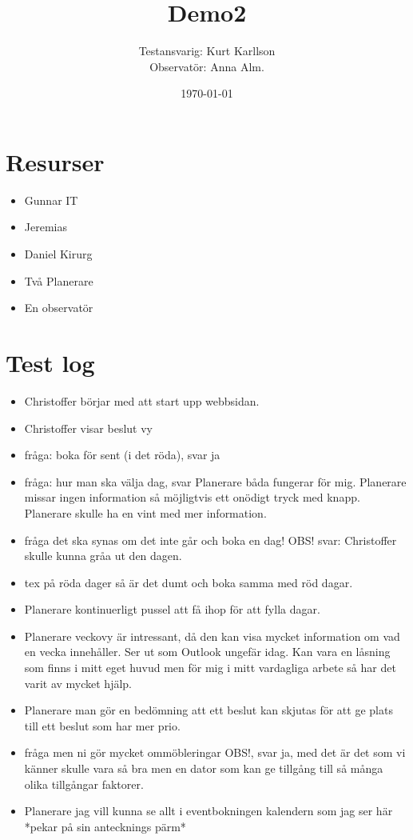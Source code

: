 \documentclass[a4paper,10pt, twoside]{article}
\title{Demo2}
\author{Testansvarig: Kurt Karllson\\Observatör: Anna Alm.}
\date{\today}
\begin{document}
\section{Resurser}
\begin{itemize}
  \item Gunnar IT
  \item Jeremias
  \item Daniel Kirurg
  \item Två Planerare
  \item En observatör
\end{itemize}

\section{Test log}

\begin{itemize}
    \item Christoffer börjar med att start upp webbsidan.
    \item Christoffer visar beslut vy
    \item fråga: boka för sent (i det röda), svar ja
    \item fråga: hur man ska välja dag, svar Planerare båda fungerar för mig. Planerare missar ingen information så möjligtvis ett onödigt tryck med knapp. Planerare skulle ha en vint med mer information.
    \item fråga det ska synas om det inte går och boka en dag! OBS! svar: Christoffer skulle kunna gråa ut den dagen.
    \item tex på röda dager så är det dumt och boka samma med röd dagar.
    \item Planerare kontinuerligt pussel att få ihop för att fylla dagar.
    \item Planerare veckovy är intressant, då den kan visa mycket information om vad en vecka innehåller. Ser ut som Outlook ungefär idag. Kan vara en låsning som finns i mitt eget huvud men för mig i mitt vardagliga arbete så har det varit av mycket hjälp.
    \item Planerare man gör en bedömning att ett beslut kan skjutas för att ge plats till ett beslut som har mer prio.
    \item fråga men ni gör mycket ommöbleringar OBS!, svar ja, med det är det som vi känner skulle vara så bra men en dator som kan ge tillgång till så många olika tillgångar faktorer.
    \item Planerare jag vill kunna se allt i eventbokningen kalendern som jag ser här *pekar på sin antecknings pärm*

\end{itemize}
\end{document}
